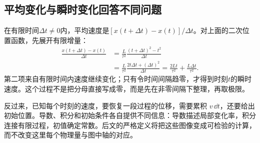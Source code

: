 \subsection{平均变化与瞬时变化回答不同问题}
在有限时间$\Delta t\ne0$内，平均速度是$[x(t+\Delta t)-x(t)]/\Delta t$。对上面的二次位置函数，先展开有限增量：
\begin{align*}
\frac{x(t+\Delta t)-x(t)}{\Delta t}
&=\frac{L}{\tau^2}\frac{(t+\Delta t)^2-t^2}{\Delta t}\\
&=\frac{L}{\tau^2}\frac{2t\Delta t+(\Delta t)^2}{\Delta t}
=\frac{2Lt}{\tau^2}+\frac{L\Delta t}{\tau^2}.
\end{align*}
第二项来自有限时间内速度继续变化；只有令时间间隔趋零，才得到时刻$t$的瞬时速度。这个过程不是把分母直接写成零，而是先在非零间隔下整理，再取极限。

反过来，已知每个时刻的速度，要恢复一段过程的位移，需要累积 $v\,\dd t$，还要给出初始位置。导数、积分和初始条件各自提供不同信息：导数描述局部变化率，积分连接有限过程，初值确定常数。后文的严格定义将把这些图像变成可检验的计算，而不改变这里每个物理量与图中轴的对应。
